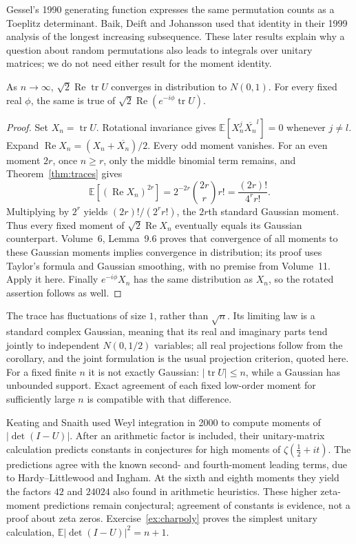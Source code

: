 Gessel's 1990 generating function expresses the same permutation counts as a Toeplitz determinant. Baik, Deift and Johansson used that identity in their 1999 analysis of the longest increasing subsequence. These later results explain why a question about random permutations also leads to integrals over unitary matrices; we do not need either result for the moment identity.

\begin{corollary}\label{cor:gaussiantrace}
As $n\to\infty$, $\sqrt2\operatorname{Re}\operatorname{tr}U$ converges in distribution to $N(0,1)$. For every fixed real $\phi$, the same is true of $\sqrt2\operatorname{Re}(e^{-i\phi}\operatorname{tr}U)$.
\end{corollary}

\begin{proof}
Set $X_n=\operatorname{tr}U$. Rotational invariance gives
$\mathbb E[X_n^j\overline{X_n}^l]=0$ whenever $j\ne l$.
Expand $\operatorname{Re}X_n=(X_n+\overline{X_n})/2$. Every odd moment vanishes. For an even moment $2r$, once $n\ge r$, only the middle binomial term remains, and Theorem~\ref{thm:traces} gives
\[
\mathbb E[(\operatorname{Re}X_n)^{2r}]
=2^{-2r}\binom{2r}{r}r!
=\frac{(2r)!}{4^r r!}.
\]
Multiplying by $2^r$ yields $(2r)!/(2^r r!)$, the $2r$th standard Gaussian moment. Thus every fixed moment of $\sqrt2\operatorname{Re}X_n$ eventually equals its Gaussian counterpart. Volume~6, Lemma~9.6 proves that convergence of all moments to these Gaussian moments implies convergence in distribution; its proof uses Taylor's formula and Gaussian smoothing, with no premise from Volume~11. Apply it here. Finally $e^{-i\phi}X_n$ has the same distribution as $X_n$, so the rotated assertion follows as well.
\end{proof}

The trace has fluctuations of size $1$, rather than $\sqrt n$. Its limiting law is a standard complex Gaussian, meaning that its real and imaginary parts tend jointly to independent $N(0,1/2)$ variables; all real projections follow from the corollary, and the joint formulation is the usual projection criterion, quoted here. For a fixed finite $n$ it is not exactly Gaussian: $|\operatorname{tr}U|\le n$, while a Gaussian has unbounded support. Exact agreement of each fixed low-order moment for sufficiently large $n$ is compatible with that difference.

\begin{beauty}
Keating and Snaith used Weyl integration in 2000 to compute moments of $|\det(I-U)|$. After an arithmetic factor is included, their unitary-matrix calculation predicts constants in conjectures for high moments of $\zeta(\tfrac12+it)$. The predictions agree with the known second- and fourth-moment leading terms, due to Hardy--Littlewood and Ingham. At the sixth and eighth moments they yield the factors $42$ and $24024$ also found in arithmetic heuristics. These higher zeta-moment predictions remain conjectural; agreement of constants is evidence, not a proof about zeta zeros. Exercise~\ref{ex:charpoly} proves the simplest unitary calculation, $\mathbb E|\det(I-U)|^2=n+1$.
\end{beauty}

